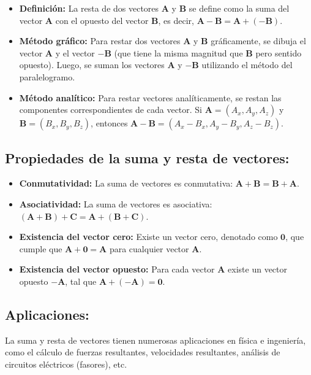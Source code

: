 \documentclass{book}
\begin{document}
\begin{itemize}
    \item \textbf{Definición:} La resta de dos vectores $\mathbf{A}$ y $\mathbf{B}$ se define como la suma del vector $\mathbf{A}$ con el opuesto del vector $\mathbf{B}$, es decir, $\mathbf{A} - \mathbf{B} = \mathbf{A} + (-\mathbf{B})$.
    \item \textbf{Método gráfico:} Para restar dos vectores $\mathbf{A}$ y $\mathbf{B}$ gráficamente, se dibuja el vector $\mathbf{A}$ y el vector $-\mathbf{B}$ (que tiene la misma magnitud que $\mathbf{B}$ pero sentido opuesto). Luego, se suman los vectores $\mathbf{A}$ y $-\mathbf{B}$ utilizando el método del paralelogramo.
    \item \textbf{Método analítico:} Para restar vectores analíticamente, se restan las componentes correspondientes de cada vector. Si $\mathbf{A} = (A_x, A_y, A_z)$ y $\mathbf{B} = (B_x, B_y, B_z)$, entonces $\mathbf{A} - \mathbf{B} = (A_x - B_x, A_y - B_y, A_z - B_z)$.
\end{itemize}

\subsection{Propiedades de la suma y resta de vectores:}

\begin{itemize}
    \item \textbf{Conmutatividad:} La suma de vectores es conmutativa: $\mathbf{A} + \mathbf{B} = \mathbf{B} + \mathbf{A}$.
    \item \textbf{Asociatividad:} La suma de vectores es asociativa: $(\mathbf{A} + \mathbf{B}) + \mathbf{C} = \mathbf{A} + (\mathbf{B} + \mathbf{C})$.
    \item \textbf{Existencia del vector cero:} Existe un vector cero, denotado como $\mathbf{0}$, que cumple que $\mathbf{A} + \mathbf{0} = \mathbf{A}$ para cualquier vector $\mathbf{A}$.
    \item \textbf{Existencia del vector opuesto:} Para cada vector $\mathbf{A}$ existe un vector opuesto $-\mathbf{A}$, tal que $\mathbf{A} + (-\mathbf{A}) = \mathbf{0}$.
\end{itemize}

\subsection{Aplicaciones:} 

La suma y resta de vectores tienen numerosas aplicaciones en física e ingeniería, como el cálculo de fuerzas resultantes, velocidades resultantes, análisis de circuitos eléctricos (fasores), etc.
\end{document}
